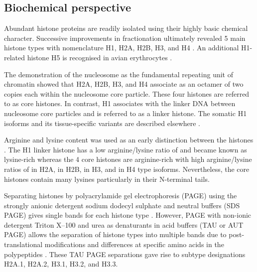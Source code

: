   \subsection{Biochemical perspective}

    Abundant histone proteins are readily isolated using their
    highly basic chemical character.
    Successive improvements in fractionation ultimately revealed 5 main histone types
    with nomenclature H1, H2A, H2B, H3, and H4 \citep{nomenclature}.
    An additional H1-related histone H5 is recognised in avian erythrocytes \citep{HFive-review}.

    The demonstration of the nucleosome as the fundamental
    repeating unit of chromatin \citep{Kornberg1974}
    showed that H2A, H2B, H3, and H4 associate as an octamer of two copies each within the
    nucleosome core particle. These four histones are referred to as core histones.
    In contrast, H1 associates with the linker DNA between nucleosome core particles
    and is referred to as a linker histone.
    The somatic H1 isoforms and its tissue-specific
    variants are described elsewhere \citep{HarshmanFreitas2013}.

    Arginine and lysine content was used as an early distinction between the histones \citep{ElginWeintraub1975}.
    The H1 linker histone has a low arginine/lysine ratio of
     \result{}
    and became known as lysine-rich
    whereas the 4 core histones are arginine-rich
    with high arginine/lysine ratios of
     \result{} in H2A,
     \result{} in H2B,
     \result{} in H3,
    and  \result{} in H4 type isoforms.
    Nevertheless, the core histones contain many lysines particularly in their N-terminal tails.

    Separating histones by polyacrylamide gel electrophoresis (PAGE)
    using the strongly anionic detergent sodium dodecyl sulphate and neutral buffers (SDS PAGE)
    gives single bands for each histone type \citep{ShechterHake2007}.
    However, PAGE with non-ionic detergent Triton X--100 and urea as denaturants
    in acid buffers (TAU or AUT PAGE) allows the separation
    of histone types into multiple bands
    due to post-translational modifications and differences at specific amino acids
    in the polypeptides \citep{Zweidler1977}.
    These TAU PAGE separations gave rise to subtype designations
    H2A.1, H2A.2, H3.1, H3.2, and H3.3.

